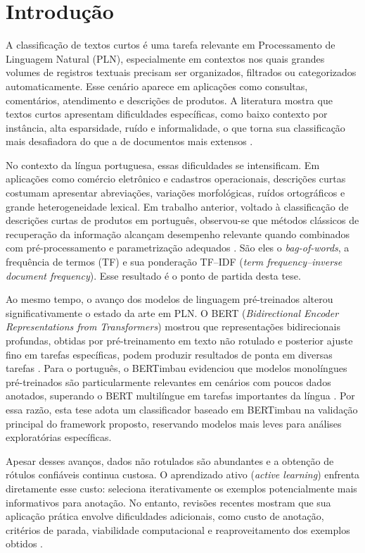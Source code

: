 \chapter{Introdução}
\label{ch:intro}

A classificação de textos curtos é uma tarefa relevante em Processamento de Linguagem
Natural (PLN), especialmente em contextos nos quais grandes volumes de registros
textuais precisam ser organizados, filtrados ou categorizados automaticamente. Esse
cenário aparece em aplicações como consultas, comentários, atendimento e descrições de
produtos. A literatura mostra que textos curtos apresentam dificuldades específicas,
como baixo contexto por instância, alta esparsidade, ruído e informalidade, o que
torna sua classificação mais desafiadora do que a de documentos mais extensos
\citep{Alsmadi2019,Song2014}.

No contexto da língua portuguesa, essas dificuldades se intensificam. Em aplicações
como comércio eletrônico e cadastros operacionais, descrições curtas costumam
apresentar abreviações, variações morfológicas, ruídos ortográficos e grande
heterogeneidade lexical. Em trabalho anterior, voltado à classificação de descrições
curtas de produtos em português, observou-se que métodos clássicos de recuperação
da informação alcançam desempenho relevante quando combinados com
pré-processamento e parametrização adequados \citep{Daru2024Dissertacao}. São eles
o \textit{bag-of-words}, a frequência de termos (TF) e sua ponderação TF--IDF
(\textit{term frequency--inverse document frequency}). Esse resultado é o
ponto de partida desta tese.

Ao mesmo tempo, o avanço dos modelos de linguagem pré-treinados alterou
significativamente o estado da arte em PLN. O BERT (\textit{Bidirectional
Encoder Representations from Transformers}) mostrou que representações
bidirecionais profundas, obtidas por pré-treinamento em texto não rotulado e
posterior ajuste fino em tarefas específicas, podem produzir resultados de ponta em
diversas tarefas \citep{Devlin2019}. Para o português, o BERTimbau evidenciou que
modelos monolíngues pré-treinados são particularmente relevantes em cenários com
poucos dados anotados, superando o BERT multilíngue em tarefas importantes da língua
\citep{Souza2020BERTimbau}. Por essa razão, esta tese adota um classificador baseado
em BERTimbau na validação principal do framework proposto, reservando modelos mais
leves para análises exploratórias específicas.

Apesar desses avanços, dados não rotulados são abundantes e a obtenção de
rótulos confiáveis continua custosa. O aprendizado
ativo (\textit{active learning}) enfrenta diretamente esse custo: seleciona
iterativamente os exemplos
potencialmente mais informativos para anotação. No entanto, revisões
recentes mostram que sua aplicação prática envolve dificuldades adicionais, como
custo de anotação, critérios de parada, viabilidade computacional e reaproveitamento
dos exemplos obtidos \citep{zhang-etal-2022-survey}.

